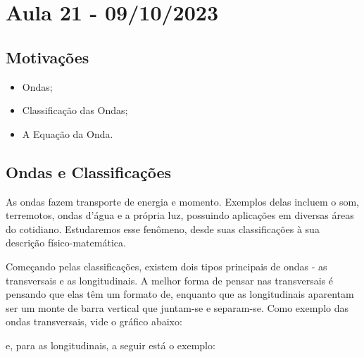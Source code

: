 \documentclass[physicsII_notes.tex]{subfiles}
\begin{document}
\section{Aula 21 - 09/10/2023}
\subsection{Motivações}
\begin{itemize}
	\item Ondas;
	\item Classificação das Ondas;
	\item A Equação da Onda.
\end{itemize}
\subsection{Ondas e Classificações}
As ondas fazem transporte de energia e momento. Exemplos delas incluem o som, terremotos,
ondas d'água e a própria luz, possuindo aplicações em diversas áreas do cotidiano. Estudaremos
esse fenômeno, desde suas classificações à sua descrição físico-matemática.

Começando pelas classificações, existem dois tipos principais de ondas - as transversais e as longitudinais.
A melhor forma de pensar nas transversais é pensando que elas têm um formato de, enquanto que as longitudinais
aparentam ser um monte de barra vertical que juntam-se e separam-se. Como exemplo
das ondas transversais, vide o gráfico abaixo:

\begin{center}
\end{center}

e, para as longitudinais, a seguir está o exemplo:

\begin{center}
\end{center}
\end{document}
